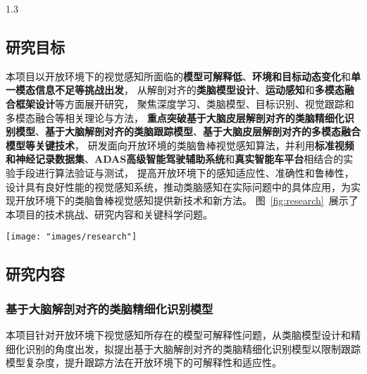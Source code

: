 \documentclass[a4paper,zihao=-4]{article}
\begin{document}
\begin{spacing}{1.3} %
	 \songti   
	
	  
	\vspace{11bp}
\end{spacing}






\textcolor{NsfcBlue}{\subsection{研究目标}}
本项目以开放环境下的视觉感知所面临的\textbf{模型可解释低}、\textbf{环境和目标动态变化}和\textbf{单一模态信息不足等挑战出发}，
从解剖对齐的\textbf{类脑模型设计}、\textbf{运动感知}和\textbf{多模态融合框架设计}等方面展开研究，
聚焦深度学习、类脑模型、目标识别、视觉跟踪和多模态融合等相关理论与方法，
\textbf{重点突破基于大脑皮层解剖对齐的类脑精细化识别模型}、\textbf{基于大脑解剖对齐的类脑跟踪模型}、\textbf{基于大脑皮层解剖对齐的多模态融合模型等关键技术}，
研发面向开放环境的类脑鲁棒视觉感知算法，并利用\textbf{标准视频和神经记录数据集}、\textbf{ADAS高级智能驾驶辅助系统}和\textbf{真实智能车平台}相结合的实验手段进行算法验证与测试，
提高开放环境下的感知适应性、准确性和鲁棒性，
设计具有良好性能的视觉感知系统，推动类脑感知在实际问题中的具体应用，为实现开放环境下的类脑鲁棒视觉感知提供新技术和新方法。
图~\ref{fig:research}~展示了本项目的技术挑战、研究内容和关键科学问题。

\begin{figure*}[htb!]
	\centering  
	{\texttt{[image: "images/research"]}
	}
	\caption{ 本项目整体研究思路与关系}
	\label{fig:research}
\end{figure*}


\textcolor{NsfcBlue}{\subsection{研究内容}}

\subsubsection{基于大脑解剖对齐的类脑精细化识别模型}
本项目针对开放环境下视觉感知所存在的模型可解释性问题，从类脑模型设计和精细化识别的角度出发，拟提出基于大脑解剖对齐的类脑精细化识别模型以限制跟踪模型复杂度，提升跟踪方法在开放环境下的可解释性和适应性。
\end{document}
